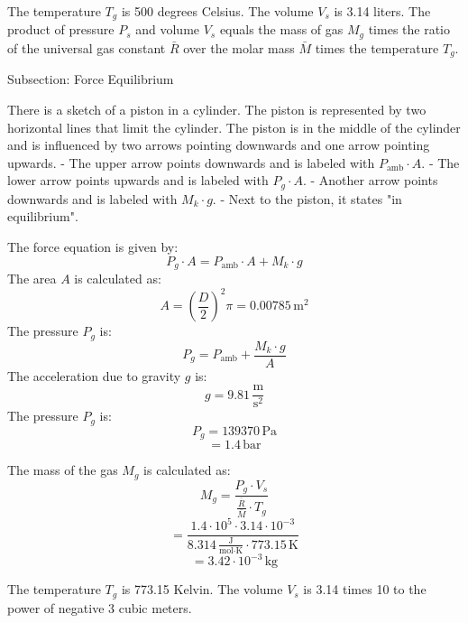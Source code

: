 The temperature \( T_g \) is 500 degrees Celsius.
The volume \( V_s \) is 3.14 liters.
The product of pressure \( P_s \) and volume \( V_s \) equals the mass of gas \( M_g \) times the ratio of the universal gas constant \( \bar{R} \) over the molar mass \( \bar{M} \) times the temperature \( T_g \).

Subsection: Force Equilibrium

There is a sketch of a piston in a cylinder. The piston is represented by two horizontal lines that limit the cylinder. The piston is in the middle of the cylinder and is influenced by two arrows pointing downwards and one arrow pointing upwards.
- The upper arrow points downwards and is labeled with \( P_{\text{amb}} \cdot A \).
- The lower arrow points upwards and is labeled with \( P_g \cdot A \).
- Another arrow points downwards and is labeled with \( M_k \cdot g \).
- Next to the piston, it states "in equilibrium".

The force equation is given by:
\[ P_g \cdot A = P_{\text{amb}} \cdot A + M_k \cdot g \]
The area \( A \) is calculated as:
\[ A = \left( \frac{D}{2} \right)^2 \pi = 0.00785 \, \text{m}^2 \]
The pressure \( P_g \) is:
\[ P_g = P_{\text{amb}} + \frac{M_k \cdot g}{A} \]
The acceleration due to gravity \( g \) is:
\[ g = 9.81 \, \frac{\text{m}}{\text{s}^2} \]
The pressure \( P_g \) is:
\[ P_g = 139370 \, \text{Pa} \]
\[ = 1.4 \, \text{bar} \]

The mass of the gas \( M_g \) is calculated as:
\[ M_g = \frac{P_g \cdot V_s}{\frac{\bar{R}}{\bar{M}} \cdot T_g} \]
\[ = \frac{1.4 \cdot 10^5 \cdot 3.14 \cdot 10^{-3}}{8.314 \, \frac{\text{J}}{\text{mol} \cdot \text{K}} \cdot 773.15 \, \text{K}} \]
\[ = 3.42 \cdot 10^{-3} \, \text{kg} \]

The temperature \( T_g \) is 773.15 Kelvin.
The volume \( V_s \) is 3.14 times 10 to the power of negative 3 cubic meters.
